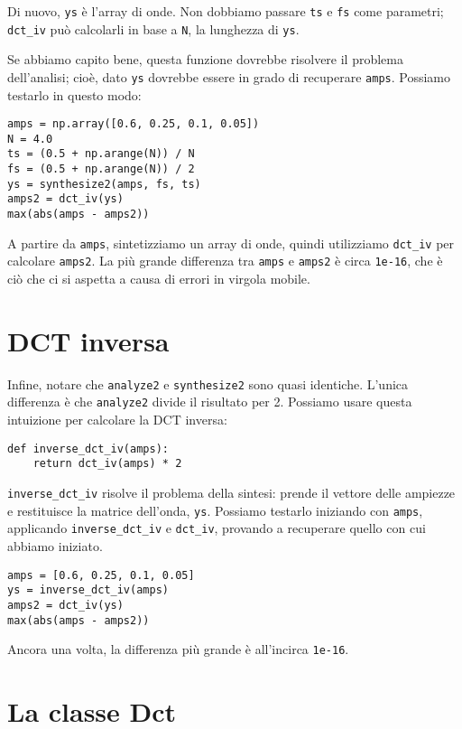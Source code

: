 \documentclass[12pt]{book} \usepackage[width=5.5in,height=8.5in, hmarginratio=3:2,vmarginratio=1:1]{geometry}
\begin{document}
Di nuovo, {\tt ys} è l'array di onde. Non dobbiamo passare {\tt ts} e {\tt fs} come parametri; \verb"dct_iv" può calcolarli in base a {\tt N}, la lunghezza di {\tt ys}.

Se abbiamo capito bene, questa funzione dovrebbe risolvere il problema dell'analisi; cioè, dato {\tt ys} dovrebbe essere in grado di recuperare {\tt amps}. Possiamo testarlo in questo modo:

\begin{verbatim} 
amps = np.array([0.6, 0.25, 0.1, 0.05])
N = 4.0
ts = (0.5 + np.arange(N)) / N
fs = (0.5 + np.arange(N)) / 2
ys = synthesize2(amps, fs, ts)
amps2 = dct_iv(ys)
max(abs(amps - amps2))
 \end{verbatim} 

A partire da {\tt amps}, sintetizziamo un array di onde, quindi utilizziamo \verb"dct_iv" per calcolare {\tt amps2}. La più grande differenza tra {\tt amps} e {\tt amps2} è circa {\tt 1e-16}, che è ciò che ci si aspetta a causa di errori in virgola mobile.

\section{DCT inversa} 

Infine, notare che {\tt analyze2} e {\tt synthesize2} sono quasi identiche. L'unica differenza è che {\tt analyze2} divide il risultato per 2. Possiamo usare questa intuizione per calcolare la DCT inversa:

\begin{verbatim} 
def inverse_dct_iv(amps):
    return dct_iv(amps) * 2
 \end{verbatim} 

\verb"inverse_dct_iv" risolve il problema della sintesi: prende il vettore delle ampiezze e restituisce la matrice dell'onda, {\tt ys}. Possiamo testarlo iniziando con {\tt amps}, applicando \verb"inverse_dct_iv" e \verb"dct_iv", provando a recuperare quello con cui abbiamo iniziato.

\begin{verbatim} 
amps = [0.6, 0.25, 0.1, 0.05]
ys = inverse_dct_iv(amps)
amps2 = dct_iv(ys)
max(abs(amps - amps2))
 \end{verbatim} 

Ancora una volta, la differenza più grande è all'incirca {\tt 1e-16}.

\section{La classe Dct} 
\end{document}
